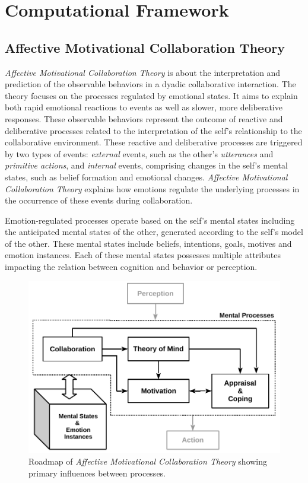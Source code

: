 \section{Computational Framework}
\label{sec:computational-framework}

\subsection{Affective Motivational Collaboration Theory}
\label{sec:AMCT}

\textit{Affective Motivational Collaboration Theory} is about the interpretation
and prediction of the observable behaviors in a dyadic collaborative
interaction. The theory focuses on the processes regulated by emotional states.
It aims to explain both rapid emotional reactions to events as well as
slower, more deliberative responses. These observable behaviors represent the
outcome of reactive and deliberative processes related to the interpretation of
the self's relationship to the collaborative environment. These reactive and
deliberative processes are triggered by two types of events: \textit{external}
events, such as the other's \textit{utterances} and \textit{primitive actions},
and \textit{internal} events, comprising changes in the self's mental states,
such as belief formation and emotional changes. \textit{Affective Motivational
Collaboration Theory} explains how emotions regulate the underlying processes in
the occurrence of these events during collaboration.

Emotion-regulated processes operate based on the self's mental states including
the anticipated mental states of the other, generated according to the self's
model of the other. These mental states include beliefs, intentions, goals,
motives and emotion instances. Each of these mental states possesses multiple
attributes impacting the relation between cognition and behavior or perception.

\begin{figure}[h!]
  \includegraphics[scale=0.78]{figure/theory-general-croped.pdf}
  \caption{Roadmap of \textit{Affective Motivational Collaboration Theory}
  showing primary influences between processes.}
  \label{fig:theory}
\end{figure}

